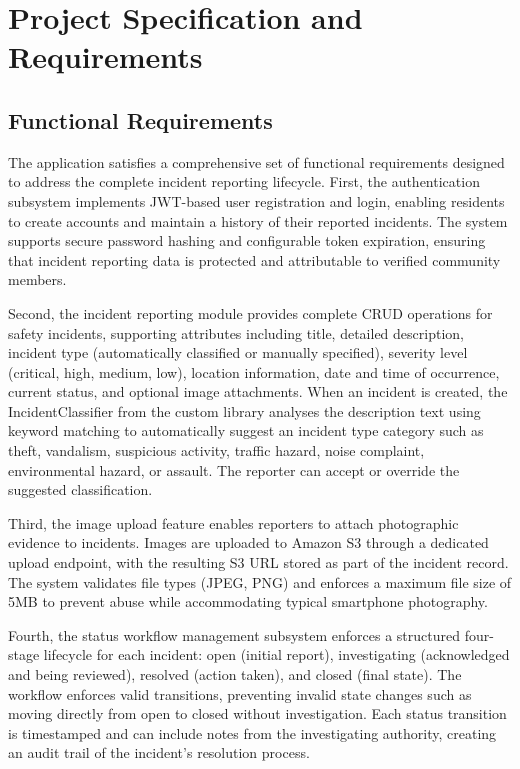 \documentclass[conference]{IEEEtran}
\begin{document}
\section{Project Specification and Requirements}

\subsection{Functional Requirements}

The application satisfies a comprehensive set of functional requirements designed to address the complete incident reporting lifecycle. First, the authentication subsystem implements JWT-based user registration and login, enabling residents to create accounts and maintain a history of their reported incidents. The system supports secure password hashing and configurable token expiration, ensuring that incident reporting data is protected and attributable to verified community members.

Second, the incident reporting module provides complete CRUD operations for safety incidents, supporting attributes including title, detailed description, incident type (automatically classified or manually specified), severity level (critical, high, medium, low), location information, date and time of occurrence, current status, and optional image attachments. When an incident is created, the IncidentClassifier from the custom library analyses the description text using keyword matching to automatically suggest an incident type category such as theft, vandalism, suspicious activity, traffic hazard, noise complaint, environmental hazard, or assault. The reporter can accept or override the suggested classification.

Third, the image upload feature enables reporters to attach photographic evidence to incidents. Images are uploaded to Amazon S3 through a dedicated upload endpoint, with the resulting S3 URL stored as part of the incident record. The system validates file types (JPEG, PNG) and enforces a maximum file size of 5MB to prevent abuse while accommodating typical smartphone photography.

Fourth, the status workflow management subsystem enforces a structured four-stage lifecycle for each incident: open (initial report), investigating (acknowledged and being reviewed), resolved (action taken), and closed (final state). The workflow enforces valid transitions, preventing invalid state changes such as moving directly from open to closed without investigation. Each status transition is timestamped and can include notes from the investigating authority, creating an audit trail of the incident's resolution process.
\end{document}
